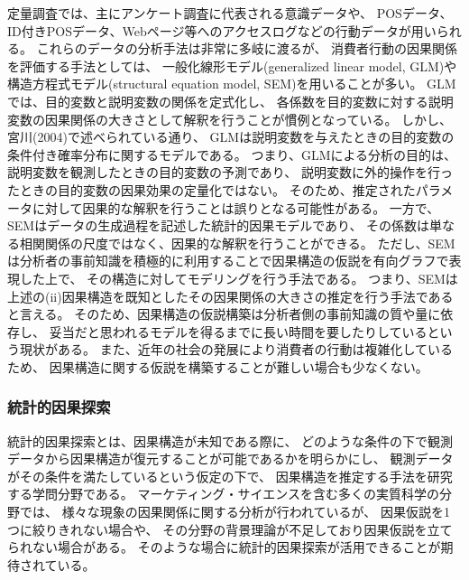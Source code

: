 定量調査では、主にアンケート調査に代表される意識データや、
POSデータ、ID付きPOSデータ、Webページ等へのアクセスログなどの行動データが用いられる。
これらのデータの分析手法は非常に多岐に渡るが、
消費者行動の因果関係を評価する手法としては、
一般化線形モデル(generalized linear model, GLM)や
構造方程式モデル(structural equation model, SEM)を用いることが多い\cite{2015-pb}\cite{2009-qw}。
GLMでは、目的変数と説明変数の関係を定式化し、
各係数を目的変数に対する説明変数の因果関係の大きさとして解釈を行うことが慣例となっている。
しかし、宮川(2004)\cite{2004-qj}で述べられている通り、
GLMは説明変数を与えたときの目的変数の条件付き確率分布に関するモデルである。
つまり、GLMによる分析の目的は、説明変数を観測したときの目的変数の予測であり、
説明変数に外的操作を行ったときの目的変数の因果効果の定量化ではない。
そのため、推定されたパラメータに対して因果的な解釈を行うことは誤りとなる可能性がある。
一方で、SEMはデータの生成過程を記述した統計的因果モデルであり、
その係数は単なる相関関係の尺度ではなく、因果的な解釈を行うことができる\cite{2004-qj}。
ただし、SEMは分析者の事前知識を積極的に利用することで因果構造の仮説を有向グラフで表現した上で、
その構造に対してモデリングを行う手法である。
つまり、SEMは上述の(ii)因果構造を既知としたその因果関係の大きさの推定を行う手法であると言える。
そのため、因果構造の仮説構築は分析者側の事前知識の質や量に依存し、
妥当だと思われるモデルを得るまでに長い時間を要したりしているという現状がある。
また、近年の社会の発展により消費者の行動は複雑化しているため、
因果構造に関する仮説を構築することが難しい場合も少なくない。


\subsubsection{統計的因果探索}

統計的因果探索とは、因果構造が未知である際に、
どのような条件の下で観測データから因果構造が復元することが可能であるかを明らかにし、
観測データがその条件を満たしているという仮定の下で、
因果構造を推定する手法を研究する学問分野である。
マーケティング・サイエンスを含む多くの実質科学の分野では、
様々な現象の因果関係に関する分析が行われているが、
因果仮説を1つに絞りきれない場合や、
その分野の背景理論が不足しており因果仮説を立てられない場合がある。
そのような場合に統計的因果探索が活用できることが期待されている\cite{2017-zx}。

